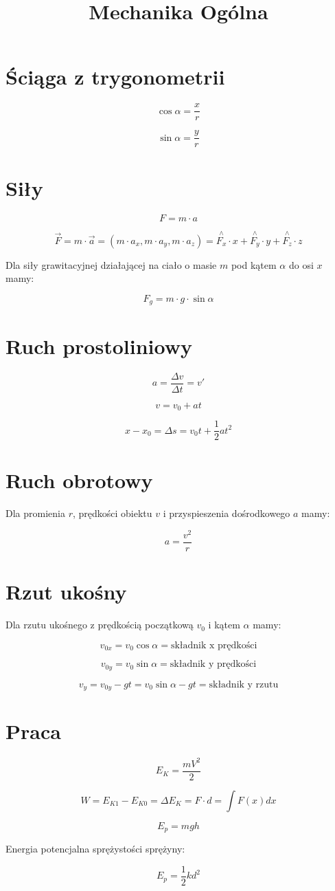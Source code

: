 \documentclass{../notatki}
\title{Mechanika Ogólna}
\begin{document}
\tableofcontents

\section{Ściąga z trygonometrii}

$$
\cos \alpha = \frac{x}{r}
$$

$$
\sin \alpha = \frac{y}{r}
$$

\section{Siły}

$$
F = m \cdot a
$$

$$
\vec{F} = m \cdot \vec{a} = (m \cdot a_x, m \cdot a_y, m \cdot a_z) = \stackrel{\wedge}{F_x} \cdot x + \stackrel{\wedge}{F_y} \cdot y + \stackrel{\wedge}{F_z} \cdot z 
$$

Dla siły grawitacyjnej działającej na ciało o masie $m$ pod kątem $\alpha$ do osi $x$ mamy:

$$
F_g = m \cdot g \cdot \sin \alpha
$$

\section{Ruch prostoliniowy}

$$
a = \frac{\Delta v}{\Delta t} = v'
$$

$$
v = v_0 + at
$$

$$
x - x_0 = \Delta s = v_0t + \frac{1}{2}a t^2
$$

\section{Ruch obrotowy}

Dla promienia $r$, prędkości obiektu $v$ i przyspieszenia dośrodkowego $a$ mamy:

$$
a = \frac{v^2}{r}
$$

\section{Rzut ukośny}

Dla rzutu ukośnego z prędkością początkową $v_0$ i kątem $\alpha$ mamy:

$$
v_{0x} = v_0 \cos \alpha = \text{składnik x prędkości}
$$

$$
v_{0y} = v_0 \sin \alpha = \text{składnik y prędkości}
$$

$$
v_y = v_{0y} - gt = v_0 \sin \alpha - gt = \text{składnik y rzutu}
$$

\section{Praca}

$$
E_K = \frac{mV^2}{2}
$$

$$
W = E_{K1} - E_{K0} = \Delta E_K = F \cdot d = \int F(x) dx
$$

$$
E_p = mgh 
$$

Energia potencjalna sprężystości sprężyny:

$$
E_p = \frac{1}{2}kd^2
$$
\end{document}
